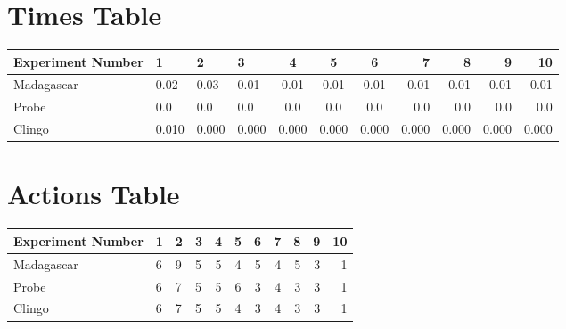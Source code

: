 \documentclass[8pt]{article}
\begin{document}
\begin{landscape}
\section{Times Table}\begin{tabular}{ | l | l | l | l | c | c | c | r | r | r | r | }\hline
Experiment Number & 1 & 2 & 3 & 4 & 5 & 6 & 7 & 8 & 9 & 10\\  \hline
Madagascar & 0.02 & 0.03 & 0.01 & 0.01 & 0.01 & 0.01 & 0.01 & 0.01 & 0.01 & 0.01\\  \hline
Probe & 0.0 & 0.0 & 0.0 & 0.0 & 0.0 & 0.0 & 0.0 & 0.0 & 0.0 & 0.0\\  \hline
Clingo & 0.010 & 0.000 & 0.000 & 0.000 & 0.000 & 0.000 & 0.000 & 0.000 & 0.000 & 0.000\\  \hline
\end{tabular}
\section{Actions Table}\begin{tabular}{ | l | l | l | l | c | c | c | r | r | r | r | }\hline
Experiment Number & 1 & 2 & 3 & 4 & 5 & 6 & 7 & 8 & 9 & 10\\ \hline
 Madagascar & 6 & 9 & 5 & 5 & 4 & 5 & 4 & 5 & 3 & 1\\ \hline
 Probe & 6 & 7 & 5 & 5 & 6 & 3 & 4 & 3 & 3 & 1\\ \hline
 Clingo & 6 & 7 & 5 & 5 & 4 & 3 & 4 & 3 & 3 & 1\\ \hline
\end{tabular}
\end{landscape}
\end{document}
